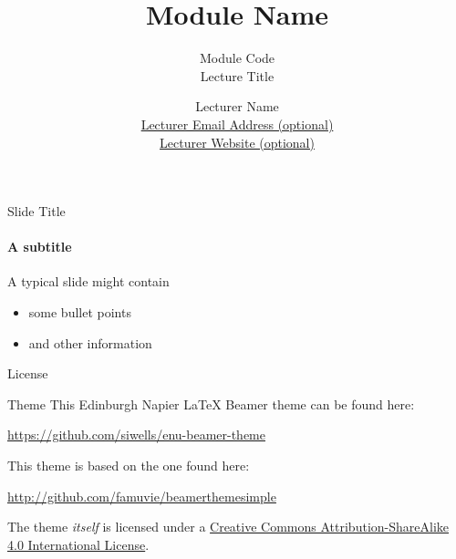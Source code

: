 \documentclass{beamer}
\title{Module Name}
\subtitle{Module Code\\Lecture Title}
\date{}%
\author{Lecturer Name\\
    \href{mailto:s.wells@napier.ac.uk}{Lecturer Email Address (optional)}\\
    \url{Lecturer Website (optional)}}
\institute{\url{Module Website Address (optional)}}
\begin{document}
\maketitle


\begin{frame}{Slide Title}
  \framesubtitle{A subtitle}

  A typical slide might contain

  \begin{itemize}
    \item some bullet points
    \item and other information
  \end{itemize}

  
\end{frame}


\begin{frame}{License}

  \begin{block}{Theme}
    This Edinburgh Napier LaTeX Beamer theme can be found here:
    \begin{center}\url{https://github.com/siwells/enu-beamer-theme}\end{center}
    This theme is based on the one found here:
    \begin{center}\url{http://github.com/famuvie/beamerthemesimple}\end{center}
  \end{block}
  
  The theme \emph{itself} is licensed under a
  \href{http://creativecommons.org/licenses/by-sa/4.0/}{Creative Commons
  Attribution-ShareAlike 4.0 International License}.

  \begin{center}\ccbysa\end{center}

\end{frame}
\end{document}
